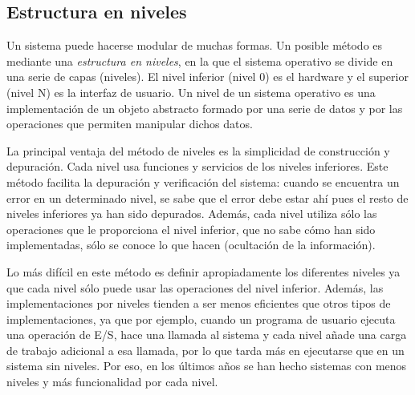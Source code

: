 \documentclass[10pt,a4paper,spanish]{report}
\begin{document}
  \subsection{Estructura en niveles}

  \noindent
  Un sistema puede hacerse modular de muchas formas. Un posible método es mediante una \textit{estructura en niveles}, en la que el sistema operativo se divide en una serie de capas (niveles). El nivel inferior (nivel 0) es el hardware y el superior (nivel N) es la interfaz de usuario. Un nivel de un sistema operativo es una implementación de un objeto abstracto formado por una serie de datos y por las operaciones que permiten manipular dichos datos.

  \noindent
  La principal ventaja del método de niveles es la simplicidad de construcción y depuración. Cada nivel usa funciones y servicios de los niveles inferiores. Este método facilita la depuración y verificación del sistema: cuando se encuentra un error en un determinado nivel, se sabe que el error debe estar ahí pues el resto de niveles inferiores ya han sido depurados. Además, cada nivel utiliza sólo las operaciones que le proporciona el nivel inferior, que no sabe cómo han sido implementadas, sólo se conoce lo que hacen (ocultación de la información).

  \noindent
  Lo más difícil en este método es definir apropiadamente los diferentes niveles ya que cada nivel sólo puede usar las operaciones del nivel inferior. Además, las implementaciones por niveles tienden a ser menos eficientes que otros tipos de implementaciones, ya que por ejemplo, cuando un programa de usuario ejecuta una operación de E/S, hace una llamada al sistema y cada nivel añade una carga de trabajo adicional a esa llamada, por lo que tarda más en ejecutarse que en un sistema sin niveles. Por eso, en los últimos años se han hecho sistemas con menos niveles y más funcionalidad por cada nivel.
\end{document}
